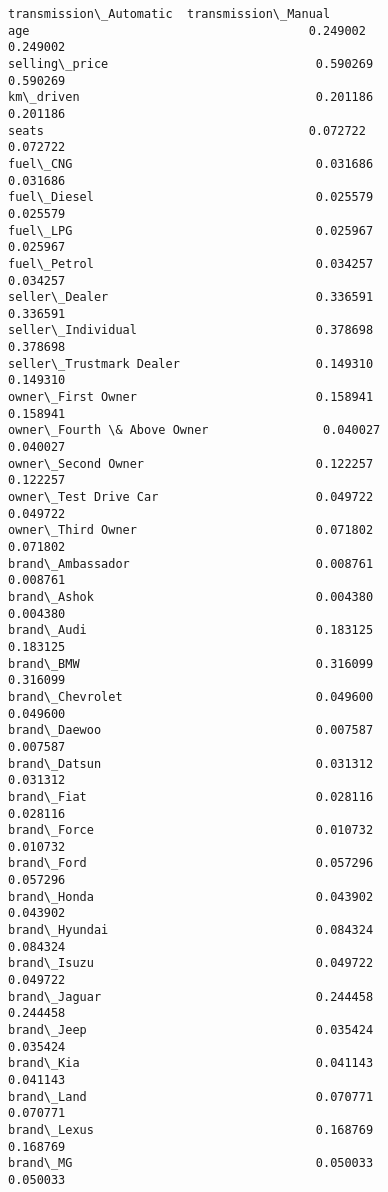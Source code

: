 \documentclass[11pt]{article}
\begin{document}
\begin{tcolorbox}[breakable, size=fbox, boxrule=.5pt, pad at break*=1mm, opacityfill=0]
\begin{Verbatim}[commandchars=\\\{\}]
                            transmission\_Automatic  transmission\_Manual
age                                       0.249002             0.249002
selling\_price                             0.590269             0.590269
km\_driven                                 0.201186             0.201186
seats                                     0.072722             0.072722
fuel\_CNG                                  0.031686             0.031686
fuel\_Diesel                               0.025579             0.025579
fuel\_LPG                                  0.025967             0.025967
fuel\_Petrol                               0.034257             0.034257
seller\_Dealer                             0.336591             0.336591
seller\_Individual                         0.378698             0.378698
seller\_Trustmark Dealer                   0.149310             0.149310
owner\_First Owner                         0.158941             0.158941
owner\_Fourth \& Above Owner                0.040027             0.040027
owner\_Second Owner                        0.122257             0.122257
owner\_Test Drive Car                      0.049722             0.049722
owner\_Third Owner                         0.071802             0.071802
brand\_Ambassador                          0.008761             0.008761
brand\_Ashok                               0.004380             0.004380
brand\_Audi                                0.183125             0.183125
brand\_BMW                                 0.316099             0.316099
brand\_Chevrolet                           0.049600             0.049600
brand\_Daewoo                              0.007587             0.007587
brand\_Datsun                              0.031312             0.031312
brand\_Fiat                                0.028116             0.028116
brand\_Force                               0.010732             0.010732
brand\_Ford                                0.057296             0.057296
brand\_Honda                               0.043902             0.043902
brand\_Hyundai                             0.084324             0.084324
brand\_Isuzu                               0.049722             0.049722
brand\_Jaguar                              0.244458             0.244458
brand\_Jeep                                0.035424             0.035424
brand\_Kia                                 0.041143             0.041143
brand\_Land                                0.070771             0.070771
brand\_Lexus                               0.168769             0.168769
brand\_MG                                  0.050033             0.050033

\end{Verbatim}
\end{tcolorbox}
\end{document}

